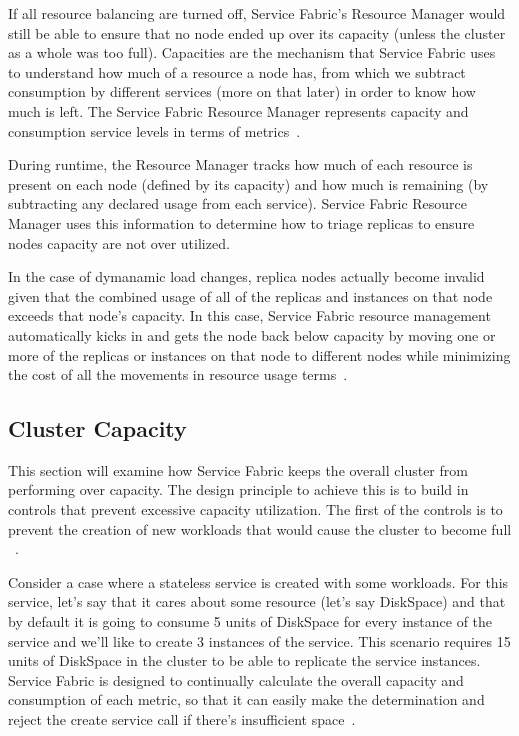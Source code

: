If all resource balancing are turned off, Service Fabric’s Resource
Manager would still be able to ensure that no node ended up over its
capacity (unless the cluster as a whole was too full). Capacities are
the mechanism that Service Fabric uses to understand how much of a
resource a node has, from which we subtract consumption by different
services (more on that later) in order to know how much is left. The
Service Fabric Resource Manager represents capacity and consumption
service levels in terms of metrics~\cite{hid-sp18-501-description}.

During runtime, the Resource Manager tracks how much of each resource
is present on each node (defined by its capacity) and how much is
remaining (by subtracting any declared usage from each service). 
Service Fabric 
Resource Manager uses this information to determine how to triage replicas
to ensure nodes capacity are not over utilized.

In the case of dymanamic load changes, replica nodes actually become invalid 
given that the combined usage of all of the replicas
and instances on that node exceeds that node’s capacity. In this case,
Service Fabric resource management automatically kicks in and gets the
node back below capacity by moving one or more of the replicas or
instances on that node to different nodes while minimizing the cost 
of all the movements in resource usage terms~\cite{hid-sp18-501-description}.

\subsection{Cluster Capacity}
This section will examine how Service Fabric keeps the overall cluster
from performing over capacity. The design principle to achieve this
is to build in controls that prevent excessive capacity utilization. 
The first of the controls is to prevent the creation
of new workloads that would cause the cluster to become full
~\cite{hid-sp18-501-fig2and3}.

Consider a case where a stateless service is created with some
workloads.  For this service, let’s say that it cares about some
resource (let’s say DiskSpace) and that by default it is going to
consume 5 units of DiskSpace for every instance of the service and
we’ll like to create 3 instances of the service. This scenario
requires 15 units of DiskSpace in the cluster to be able to replicate
the service instances.  Service Fabric is designed to continually
calculate the overall capacity and consumption of each metric, so that
it can easily make the determination and reject the create service
call if there’s insufficient space~\cite{hid-sp18-501-fig2and3}.

